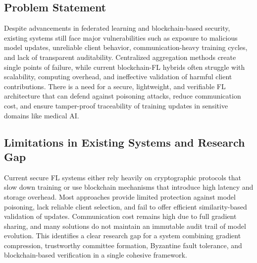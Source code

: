 \documentclass[12pt,a4paper]{article}
\begin{document}
\subsection{Problem Statement}
Despite advancements in federated learning and blockchain-based security, existing systems still face major vulnerabilities such as exposure to malicious model updates, unreliable client behavior, communication-heavy training cycles, and lack of transparent auditability. Centralized aggregation methods create single points of failure, while current blockchain-FL hybrids often struggle with scalability, computing overhead, and ineffective validation of harmful client contributions. There is a need for a secure, lightweight, and verifiable FL architecture that can defend against poisoning attacks, reduce communication cost, and ensure tamper-proof traceability of training updates in sensitive domains like medical AI.

\subsection{Limitations in Existing Systems and Research Gap}
Current secure FL systems either rely heavily on cryptographic protocols that slow down training or use blockchain mechanisms that introduce high latency and storage overhead. Most approaches provide limited protection against model poisoning, lack reliable client selection, and fail to offer efficient similarity-based validation of updates. Communication cost remains high due to full gradient sharing, and many solutions do not maintain an immutable audit trail of model evolution. This identifies a clear research gap for a system combining gradient compression, trustworthy committee formation, Byzantine fault tolerance, and blockchain-based verification in a single cohesive framework.
\end{document}
